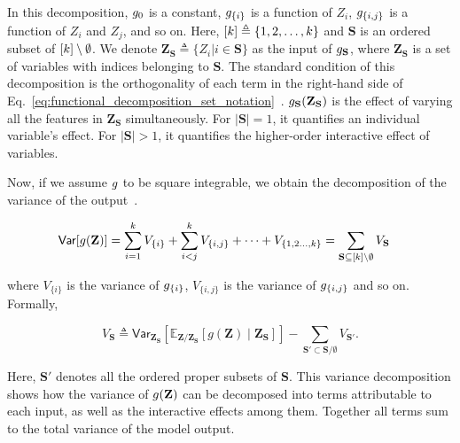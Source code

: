 In this decomposition, $ g_0 $ is a constant, $ g_{\{i\}} $ is a function of $ Z_i $, $ g_{\{i,j\}} $ is a function of $ Z_i $ and $ Z_j $, and so on. Here, $ [k] \triangleq \{1,2,\dots, k\} $ and $ \mathbf{S}$ is an ordered subset of $[k] \setminus \emptyset $.  We denote $ \mathbf{Z}_{\mathbf{S}}  \triangleq \{Z_i | i \in \mathbf{S}\}$ as the input of $ g_{\mathbf{S}} $, where $ \mathbf{Z}_{\mathbf{S}}$ is a set of variables with indices belonging to $ \mathbf{S} $.  The standard condition of this decomposition is the orthogonality of each term in the right-hand side of Eq.~\eqref{eq:functional_decomposition_set_notation}~\cite{sobol1990sensitivity}. $ g_{\mathbf{S}}(\mathbf{Z}_{\mathbf{S}}) $ is the effect of varying all the features in $\mathbf{Z}_{\mathbf{S}}$ simultaneously. %
For $|\mathbf{S}|=1$, it quantifies an individual variable's effect. For $|\mathbf{S}|>1$, it quantifies the higher-order interactive effect of variables.

Now, if we assume $ g $ to be square integrable, we obtain the decomposition of the variance of the output~\cite{sobol1990sensitivity}.

\begin{align}\label{eq:variance_decomposition_set_notation}
	\mathsf{Var}[g(\mathbf{Z})] &= \sum_{i=1}^{k}V_{\{i\}} +  \sum_{i<j}^{k} V_{\{i,j\}}  + \cdots  + V_{\{1, 2\dots, k\}}= \sum_{\mathbf{S} \subseteq [k] \setminus \emptyset} V_{\mathbf{S}} 
\end{align}

where $ V_{\{i\}} $ is the variance of $ g_{\{i\}} $, $ V_{\{i,j\}} $ is the variance of $ g_{\{i,j\}} $ and so on. Formally,  

\[ V_{\mathbf{S}} \triangleq \mathsf{Var} _{\mathbf{Z}_{\mathbf{S}}}\left[\mathbb{E}_{{\textbf {Z}}/\mathbf{Z}_{\mathbf{S}}}[g(\mathbf{Z})\mid \mathbf{Z}_{\mathbf{S}}]\right]- \sum_{\mathbf{S}' \subset \mathbf{S}/\emptyset}{V} _{\mathbf{S}'}.\] 

Here, $\mathbf{S}'$ denotes all the ordered proper subsets of $\mathbf{S}$. %
This variance decomposition shows how the variance of $g(\mathbf{Z}) $ can be decomposed into terms attributable to each input, as well as the interactive effects among them. Together all terms sum to the total variance of the model output. 


